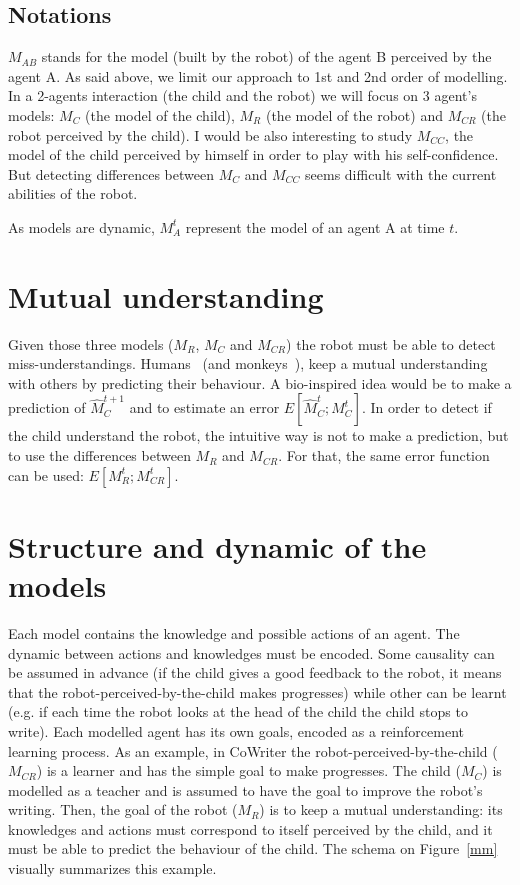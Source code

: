 \documentclass[conference]{IEEEtran}
\begin{document}
\subsection{Notations}
$M_\textit{AB}$ stands for the model (built by the robot) of the agent B perceived by the agent A. As said above, we limit our approach to 1st and 2nd order of modelling. In a 2-agents interaction (the child and the robot) we will focus on 3 agent's models: $M_\textit{C}$ (the model of the child), $M_\textit{R}$ (the model of the robot) and $M_\textit{CR}$ (the robot perceived by the child). I would be also interesting to study $M_\textit{CC}$, the model of the child perceived by himself in order to play with his self-confidence. But detecting differences between $M_\textit{C}$ and $M_\textit{CC}$ seems difficult with the current abilities of the robot. 

As models are dynamic, $M_\textit{A}^t$ represent the model of an agent A at time $t$.

\section{Mutual understanding}
Given those three models ($M_\textit{R}$, $M_\textit{C}$ and $M_\textit{CR}$) the robot must be able to detect miss-understandings. Humans~\cite{suzuki2015neural} (and monkeys~\cite{haroush2015neuronal}), keep a mutual understanding with others by predicting their behaviour. A bio-inspired idea would be to make a prediction of $\hat{M}_\textit{C}^{t+1}$ and to estimate an error $E\left[\hat{M}_\textit{C}^{t};M_\textit{C}^{t}\right]$. In order to detect if the child understand the robot, the intuitive way is not to make a prediction, but to use the differences between $M_\textit{R}$ and $M_\textit{CR}$. For that, the same error function can be used: $E\left[M_\textit{R}^{t};M_\textit{CR}^{t}\right]$.

\section{Structure and dynamic of the models}
Each model contains the knowledge and possible actions of an agent. The dynamic between actions and knowledges must be encoded. Some causality can be assumed in advance (if the child gives a good feedback to the robot, it means that the robot-perceived-by-the-child makes progresses) while other can be learnt (e.g. if each time the robot looks at the head of the child the child stops to write). Each modelled agent has its own goals, encoded as a reinforcement learning process. As an example, in CoWriter the robot-perceived-by-the-child ($M_\textit{CR}$) is a learner and has the simple goal to make progresses. The child ($M_\textit{C}$) is modelled as a teacher and is assumed to have the goal to improve the robot's writing. Then, the goal of the robot ($M_\textit{R}$) is to keep a mutual understanding: its knowledges and actions must correspond to itself perceived by the child, and it must be able to predict the behaviour of the child. The schema on Figure~\ref{mm} visually summarizes this example.
\end{document}
